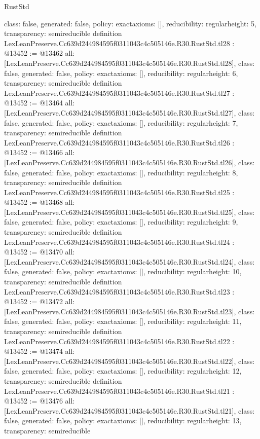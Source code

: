 \begin{lexlean}{RustStd}
\begin{coremodule}
{  class: false,
  generated: false,
  policy: exact{axioms: []},
  reducibility: regular{height: 5},
  transparency: semireducible
}
definition LexLeanPreserve.Cc639d244984595f0311043c4c505146e.R30.RustStd.tl28 : @13452 := @13462 {
  all: [LexLeanPreserve.Cc639d244984595f0311043c4c505146e.R30.RustStd.tl28],
  class: false,
  generated: false,
  policy: exact{axioms: []},
  reducibility: regular{height: 6},
  transparency: semireducible
}
definition LexLeanPreserve.Cc639d244984595f0311043c4c505146e.R30.RustStd.tl27 : @13452 := @13464 {
  all: [LexLeanPreserve.Cc639d244984595f0311043c4c505146e.R30.RustStd.tl27],
  class: false,
  generated: false,
  policy: exact{axioms: []},
  reducibility: regular{height: 7},
  transparency: semireducible
}
definition LexLeanPreserve.Cc639d244984595f0311043c4c505146e.R30.RustStd.tl26 : @13452 := @13466 {
  all: [LexLeanPreserve.Cc639d244984595f0311043c4c505146e.R30.RustStd.tl26],
  class: false,
  generated: false,
  policy: exact{axioms: []},
  reducibility: regular{height: 8},
  transparency: semireducible
}
definition LexLeanPreserve.Cc639d244984595f0311043c4c505146e.R30.RustStd.tl25 : @13452 := @13468 {
  all: [LexLeanPreserve.Cc639d244984595f0311043c4c505146e.R30.RustStd.tl25],
  class: false,
  generated: false,
  policy: exact{axioms: []},
  reducibility: regular{height: 9},
  transparency: semireducible
}
definition LexLeanPreserve.Cc639d244984595f0311043c4c505146e.R30.RustStd.tl24 : @13452 := @13470 {
  all: [LexLeanPreserve.Cc639d244984595f0311043c4c505146e.R30.RustStd.tl24],
  class: false,
  generated: false,
  policy: exact{axioms: []},
  reducibility: regular{height: 10},
  transparency: semireducible
}
definition LexLeanPreserve.Cc639d244984595f0311043c4c505146e.R30.RustStd.tl23 : @13452 := @13472 {
  all: [LexLeanPreserve.Cc639d244984595f0311043c4c505146e.R30.RustStd.tl23],
  class: false,
  generated: false,
  policy: exact{axioms: []},
  reducibility: regular{height: 11},
  transparency: semireducible
}
definition LexLeanPreserve.Cc639d244984595f0311043c4c505146e.R30.RustStd.tl22 : @13452 := @13474 {
  all: [LexLeanPreserve.Cc639d244984595f0311043c4c505146e.R30.RustStd.tl22],
  class: false,
  generated: false,
  policy: exact{axioms: []},
  reducibility: regular{height: 12},
  transparency: semireducible
}
definition LexLeanPreserve.Cc639d244984595f0311043c4c505146e.R30.RustStd.tl21 : @13452 := @13476 {
  all: [LexLeanPreserve.Cc639d244984595f0311043c4c505146e.R30.RustStd.tl21],
  class: false,
  generated: false,
  policy: exact{axioms: []},
  reducibility: regular{height: 13},
  transparency: semireducible
}
\end{coremodule}
\end{lexlean}
